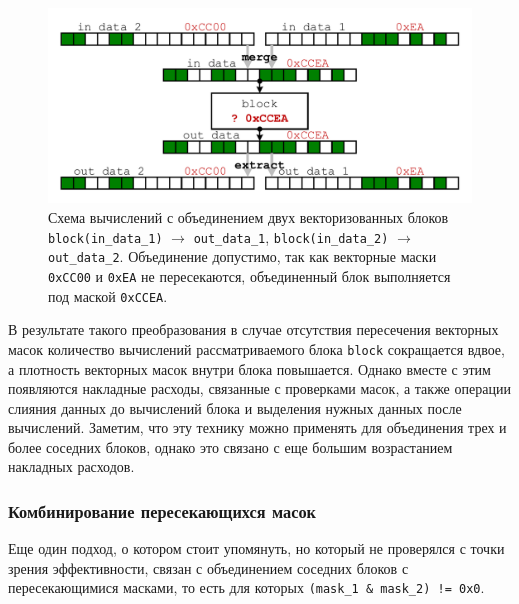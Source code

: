 \begin{figure}[ht]
\centering
\includegraphics[width=1.0\textwidth]{./fig/vec_masks_union.pdf}
\singlespacing
{}\caption{Схема вычислений с объединением двух векторизованных блоков \texttt{block(in\_data\_1)} $\rightarrow$ \texttt{out\_data\_1}, \texttt{block(in\_data\_2)} $\rightarrow$ \texttt{out\_data\_2}.
Объединение допустимо, так как векторные маски \texttt{0xCC00} и \texttt{0xEA} не пересекаются, объединенный блок выполняется под маской \texttt{0xCCEA}.}
\label{fig:text_4_vec_comb_mask_comb_masks}
\end{figure}

В результате такого преобразования в случае отсутствия пересечения векторных масок количество вычислений рассматриваемого блока \texttt{block} сокращается вдвое, а плотность векторных масок внутри блока повышается.
Однако вместе с этим появляются накладные расходы, связанные с проверками масок, а также операции слияния данных до вычислений блока и выделения нужных данных после вычислений.
Заметим, что эту технику можно применять для объединения трех и более соседних блоков, однако это связано с еще большим возрастанием накладных расходов.

\subsubsection{Комбинирование пересекающихся масок}

Еще один подход, о котором стоит упомянуть, но который не проверялся с точки зрения эффективности, связан с объединением соседних блоков с пересекающимися масками, то есть для которых \texttt{(mask\_1 \& mask\_2) != 0x0}.

